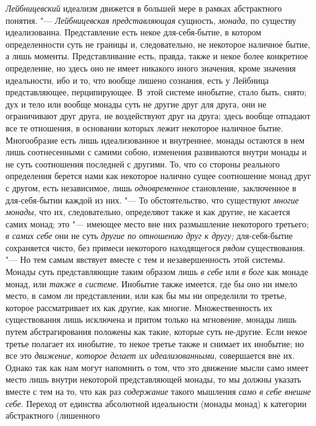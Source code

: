 {\em Лейбницевский} идеализм движется в большей мере в
рамках абстрактного понятия. "--- {\em Лейбницевская
представляющая} сущность, {\em монада}, по существу
идеализованна. Представление есть некое для-себя-бытие, в котором
определенности суть не границы и, следовательно, не некоторое наличное
бытие, а лишь моменты. Представливание есть, правда, также и некое более
конкретное определение, но здесь оно не имеет никакого иного значения,
кроме значения идеальности, ибо и то, что вообще лишено сознания, есть у
Лейбница представляющее, перципирующее. В~этой системе инобытие, стало
быть, снято; дух и тело или вообще монады суть не другие друг для друга,
они не ограничивают друг друга, не воздействуют друг на друга; здесь вообще
отпадают все те отношения, в основании которых лежит некоторое наличное
бытие. Многообразие есть лишь идеализованное и внутреннее, монады остаются
в нем лишь соотнесенными с самими собою, изменения развиваются внутри
монады и не суть соотношения последней с другими. То, что со стороны
реального определения берется нами как некоторое налично сущее соотношение
монад друг с другом, есть независимое, лишь
{\em одновременное} становление, заключенное в
для-себя-бытии каждой из них. "--- То обстоятельство, что существуют
{\em многие монады}, что их, следовательно, определяют
также и как другие, не касается самих монад; это "--- имеющее место вне них
размышление некоторого третьего; {\em в самих себе} они
не суть {\em другие по отношению друг к другу;}
для-себя-бытие сохраняется чисто, без примеси некоторого находящегося
{\em рядом} существования. "--- Но тем самым явствует
вместе с тем и незавершенность этой системы. Монады суть представляющие
таким образом лишь {\em в себе} или {\em в боге} как монаде монад, или
{\em также в системе}. Инобытие также имеется, где бы
оно ни имело место, в самом ли представлении, или как бы мы ни определили
то третье, которое рассматривает их как другие, как многие. Множественность
их существования лишь исключена и притом только на мгновение, монады лишь
путем абстрагирования положены как такие, которые суть не-другие. Если
некое третье полагает их инобытие, то некое третье также и снимает их
инобытие; но все это {\em движение, которое делает их
идеализованными}, совершается вне их. Однако так как нам могут напомнить о
том, что это движение мысли само имеет место лишь внутри некоторой
представляющей монады, то мы должны указать вместе с тем на то, что как раз
{\em содержание} такого мышления
{\em само в себе внешне себе}. Переход от единства
абсолютной идеальности (монады монад) к категории абстрактного (лишенного
